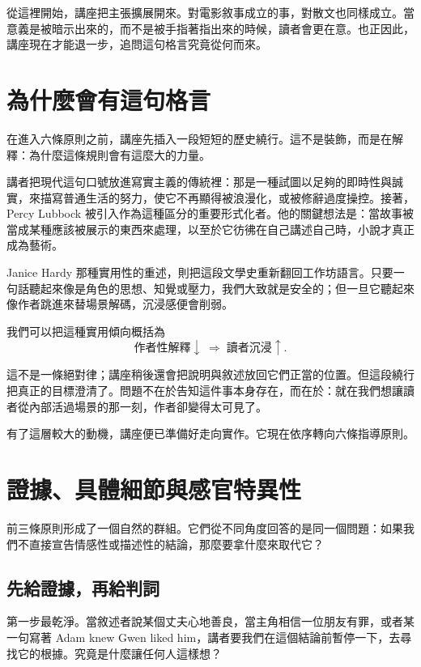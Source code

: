 從這裡開始，講座把主張擴展開來。對電影敘事成立的事，對散文也同樣成立。當意義是被暗示出來的，而不是被手指著指出來的時候，讀者會更在意。也正因此，講座現在才能退一步，追問這句格言究竟從何而來。

\section{為什麼會有這句格言}

在進入六條原則之前，講座先插入一段短短的歷史繞行。這不是裝飾，而是在解釋：為什麼這條規則會有這麼大的力量。

講者把現代這句口號放進寫實主義的傳統裡：那是一種試圖以足夠的即時性與誠實，來描寫普通生活的努力，使它不再顯得被浪漫化，或被修辭過度操控。接著，Percy Lubbock 被引入作為這種區分的重要形式化者。他的關鍵想法是：當故事被當成某種應該被展示的東西來處理，以至於它彷彿在自己講述自己時，小說才真正成為藝術。

Janice Hardy 那種實用性的重述，則把這段文學史重新翻回工作坊語言。只要一句話聽起來像是角色的思想、知覺或壓力，我們大致就是安全的；但一旦它聽起來像作者跳進來替場景解碼，沉浸感便會削弱。

我們可以把這種實用傾向概括為
\begin{equation}
\text{作者性解釋} \downarrow \;\Longrightarrow\; \text{讀者沉浸} \uparrow.
\end{equation}

這不是一條絕對律；講座稍後還會把說明與敘述放回它們正當的位置。但這段繞行把真正的目標澄清了。問題不在於告知這件事本身存在，而在於：就在我們想讓讀者從內部活過場景的那一刻，作者卻變得太可見了。

有了這層較大的動機，講座便已準備好走向實作。它現在依序轉向六條指導原則。

\section{證據、具體細節與感官特異性}

前三條原則形成了一個自然的群組。它們從不同角度回答的是同一個問題：如果我們不直接宣告情感性或描述性的結論，那麼要拿什麼來取代它？

\subsection{先給證據，再給判詞}

第一步最乾淨。當敘述者說某個丈夫心地善良，當主角相信一位朋友有罪，或者某一句寫著 Adam knew Gwen liked him，講者要我們在這個結論前暫停一下，去尋找它的根據。究竟是什麼讓任何人這樣想？

